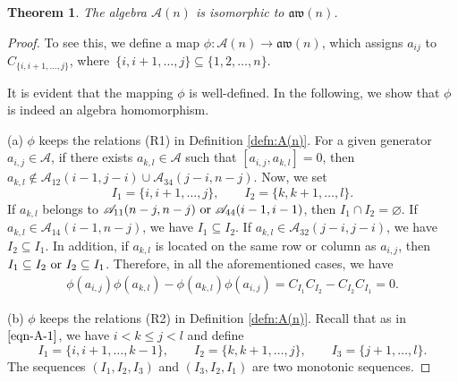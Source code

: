 \documentclass[pdftex]{sigma}
\numberwithin{equation}{section}
\def\lr#1{\left[#1\right]}
\def\A{\mathscr{A}}
\def\aw{\mathfrak{aw}}
\newtheorem{Theorem}{Theorem}[section]
\begin{document}
\begin{Theorem}
The algebra $\A(n)$ is isomorphic to $\aw(n)$.
\end{Theorem}
\begin{proof}
To see this, we define a map $\phi\colon \A(n) \rightarrow \aw(n)$, which assigns $a_{ij}$ to $C_{\{i, i+1, \dots, j\}}$, where~${\{i, i+1, \dots, j\}\subseteq\{1, 2, \dots, n\}}$.

It is evident that the mapping $\phi$ is well-defined.
In the following, we show that $\phi$ is indeed an algebra homomorphism.

(a) $\phi$ keeps the relations (R1) in Definition \ref{defn:A(n)}.
For a given generator $a_{i,j}\in \A$, if there exists $a_{k,l}\in \A$ such that $\lr{a_{i,j}, a_{k,l}}=0$, then $a_{k,l}\not\in \A_{12}(i-1,j-i)\cup \A_{34}(j-i,n-j)$.
Now, we set
\begin{equation*}
I_1=\{i, i+1, \dots, j\}, \qquad I_2=\{k, k+1, \dots, l\}.
\end{equation*}
If $a_{k,l}$ belongs to $\A_{11}(n-j,n-j) \hbox{ or } \A_{44}(i-1,i-1)$, then
$
I_1\cap I_2=\varnothing$.
If $a_{k,l} \in \A_{14}(i-1,n-j)$, we have
$
I_1 \subseteq I_2$.
If $a_{k,l} \in \A_{32}(j-i,j-i)$, we have
$
I_2 \subseteq I_1$.
In addition, if $a_{k,l}$ is located on the same row or column as $a_{i,j}$, then
$
I_1 \subseteq I_2 \hbox{ or } I_2 \subseteq I_1$.
Therefore, in all the aforementioned cases, we have
\begin{gather*}
 \phi(a_{i, j})\phi(a_{k, l})-\phi(a_{k, l})\phi(a_{i, j})
 =C_{I_1}C_{I_2}-C_{I_2}C_{I_1}
 =0.
\end{gather*}

(b) $\phi$ keeps the relations (R2) in Definition \ref{defn:A(n)}.
Recall that \smash{$\A_{i,k,j+1}^{k-1,j,l}$} as in $\eqref{eqn-A-1}$, we have $ i < k \leq j < l $ and define
 \begin{equation*}
 I_1=\{i, i+1, \dots, k-1\}, \qquad I_2=\{k, k+1, \dots, j\}, \qquad I_3=\{j+1, \dots, l\}.
 \end{equation*}
The sequences $(I_1, I_2, I_3)$ and $(I_3,I_2,I_1)$ are two monotonic sequences.


\end{proof}
\end{document}
